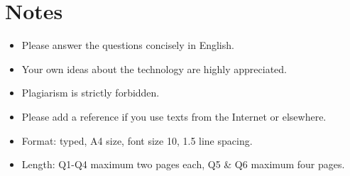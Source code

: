 \documentclass{article}
\begin{document}
\section*{Notes}

\begin{itemize}
\item Please answer the questions concisely in English.
\item Your own ideas about the technology are highly appreciated.
\item Plagiarism is strictly forbidden.
\item Please add a reference if you use texts from the Internet or elsewhere.
\item Format: typed, A4 size, font size 10, 1.5 line spacing.
\item Length: Q1-Q4 maximum two pages each, Q5 & Q6 maximum four pages.
\end{itemize}
\end{document}
